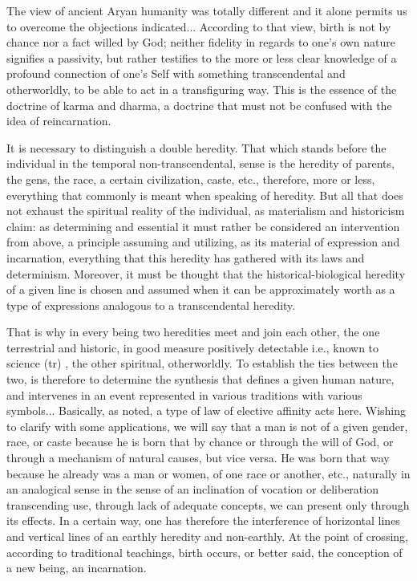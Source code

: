 \begin{quotationx}
The view of ancient Aryan humanity was totally different and it alone permits us to overcome the objections indicated... According to that view, birth is not by chance nor a fact willed by God; neither fidelity in regards to one's own nature signifies a passivity, but rather testifies to the more or less clear knowledge of a profound connection of one's Self with something transcendental and otherworldly, to be able to act in a transfiguring way. This is the essence of the doctrine of karma and dharma, a doctrine that must not be confused with the idea of reincarnation.

It is necessary to distinguish a double heredity. That which stands before the individual in the temporal non-transcendental, sense is the heredity of parents, the gens, the race, a certain civilization, caste, etc., therefore, more or less, everything that commonly is meant when speaking of heredity. But all that does not exhaust the spiritual reality of the individual, as materialism and historicism claim: as determining and essential it must rather be considered an intervention from above, a principle assuming and utilizing, as its material of expression and incarnation, everything that this heredity has gathered with its laws and determinism. Moreover, it must be thought that the historical-biological heredity of a given line is chosen and assumed when it can be approximately worth as a type of expressions analogous to a transcendental heredity.

That is why in every being two heredities meet and join each other, the one terrestrial and historic, in good measure positively detectable i.e., known to science (tr) , the other spiritual, otherworldly. To establish the ties between the two, is therefore to determine the synthesis that defines a given human nature, and intervenes in an event represented in various traditions with various symbols... Basically, as noted, a type of law of elective affinity acts here. Wishing to clarify with some applications, we will say that a man is not of a given gender, race, or caste because he is born that by chance or through the will of God, or through a mechanism of natural causes, but vice versa. He was born that way because he already was a man or women, of one race or another, etc., naturally in an analogical sense in the sense of an inclination of vocation or deliberation transcending use, through lack of adequate concepts, we can present only through its effects. In a certain way, one has therefore the interference of horizontal lines and vertical lines of an earthly heredity and non-earthly. At the point of crossing, according to traditional teachings, birth occurs, or better said, the conception of a new being, an incarnation.


\end{quotationx}

